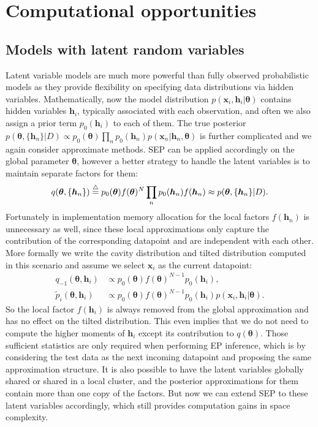 
\section{Computational opportunities}

\subsection{Models with latent random variables}
Latent variable models are much more powerful than fully observed probabilistic models as they provide flexibility on specifying data distributions via hidden variables. Mathematically, now the model distribution $p(\bm{x}_i, \bm{h}_i | \bm{\theta})$ contains hidden variables $\bm{h}_i$, typically associated with each observation, and often we also assign a prior term $p_0(\bm{h}_i)$ to each of them. The true posterior $p(\bm{\theta}, \{ \bm{h}_n\} | D) \propto p_0(\bm{\theta}) \prod_n p_0(\bm{h}_n) p(\bm{x}_n | \bm{h}_n, \bm{\theta})$ is further complicated and we again consider approximate methods. SEP can be applied accordingly on the global parameter $\bm{\theta}$, however a better strategy to handle the latent variables is to maintain separate factors for them:
\begin{equation}
q(\bm{\theta}, \{ \bm{h}_n\}) \buildrel\triangle\over = p_0(\bm{\theta}) f(\bm{\theta})^N \prod_n p_0(\bm{h}_n) f(\bm{h}_n) \approx p(\bm{\theta}, \{ \bm{h}_n\} | D).
\end{equation}
Fortunately in implementation memory allocation for the local factors $f(\bm{h}_n)$ is unnecessary as well, since these local approximations only capture the contribution of the corresponding datapoint and are independent with each other. More formally we write the cavity distribution and tilted distribution computed in this scenario and assume we select $\bm{x}_i$ as the current datapoint:
\begin{align}
q_{-1}(\bm{\theta}, \bm{h}_i) &\propto  p_0(\bm{\theta}) f(\bm{\theta})^{N-1} p_0(\bm{h}_i), \\
\tilde{p}_i(\bm{\theta}, \bm{h}_i) &\propto p_0(\bm{\theta}) f(\bm{\theta})^{N-1} p_0(\bm{h}_i) p(\bm{x}_i, \bm{h}_i | \bm{\theta}).
\end{align}
So the local factor $f(\bm{h}_i)$ is always removed from the global approximation and has no effect on the tilted distribution. This even implies that we do not need to compute the higher moments of $\bm{h}_i$ except its contribution to $q(\bm{\theta})$. Those sufficient statistics are only required when performing EP inference, which is by considering the test data as the next incoming datapoint and proposing the same approximation structure. It is also possible to have the latent variables globally shared or shared in a local cluster, and the posterior approximations for them contain more than one copy of the factors. But now we can extend SEP to these latent variables accordingly, which still provides computation gains in space complexity.

